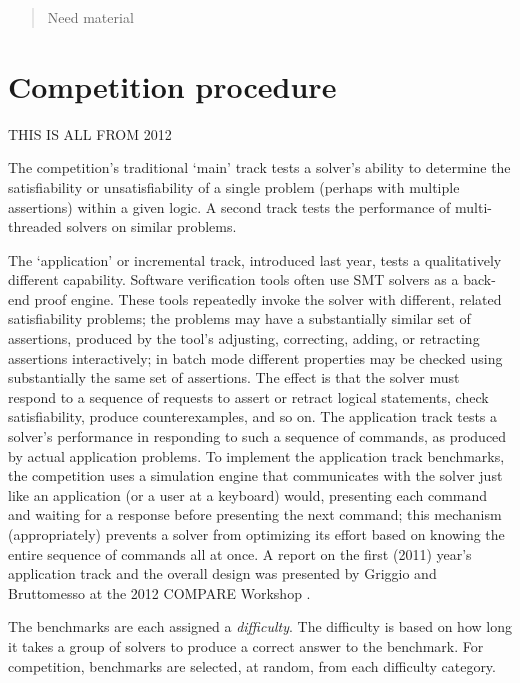 \documentclass[twosize,11pt]{article}
\newcommand{\comment}[2]{\begin{quote}\sc #1\marginpar{\textcolor{red}{$\ast^{\mbox{#2}}$}}\end{quote}}
\newcommand{\tjark}[1]{\comment{#1}{TW}}
\newcommand{\tjarkx}[1]{\tjark{#1}}
\begin{document}
\tjarkx{Need material}

\section{Competition procedure} 
\label{sec:procedure}

THIS IS ALL FROM 2012

The competition's traditional `main' track tests a solver's ability to determine the satisfiability or unsatisfiability of a single problem (perhaps with multiple assertions) within a given logic. A second track tests the performance of multi-threaded solvers on similar problems.

The `application' or incremental track, introduced last year, tests a qualitatively different capability. Software verification tools often use SMT solvers as a back-end proof engine. These tools repeatedly invoke the solver with different, related satisfiability problems; the problems may have a substantially similar set of assertions, produced by the tool's adjusting, correcting, adding, or retracting assertions interactively; in batch mode different properties may be checked using substantially the same set of assertions.
The effect is that the solver must respond to a sequence of requests to assert or retract logical statements, check satisfiability, produce counterexamples, and so on. The application track tests a solver's performance in responding to such a sequence of commands, as produced by actual application problems. To implement the application track benchmarks, the 
competition uses a simulation engine that communicates with the solver just like an application (or a user at a keyboard) would, presenting each command and waiting for a response before presenting the next command; this mechanism (appropriately) prevents a solver from optimizing its effort based on knowing the entire sequence of commands all at once. A report
on the first (2011) year's application track and the overall design was presented by Griggio and Bruttomesso at the 
2012 COMPARE Workshop \cite{ag+rb+12}.

The benchmarks are each assigned a {\em difficulty}. The difficulty is based on how long it takes a group of solvers to produce a correct answer to the benchmark. For competition, benchmarks are selected, at random, from each difficulty category. 
\end{document}
